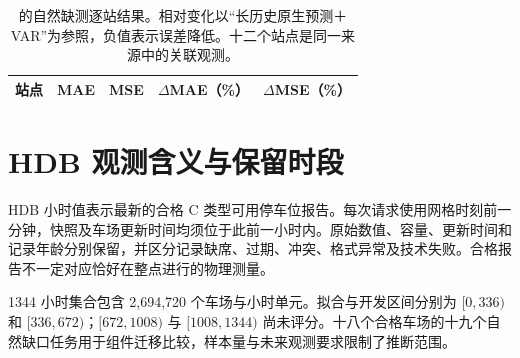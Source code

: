 \begin{table}[H]
\caption{\method{}的自然缺测逐站结果。相对变化以“长历史原生预测＋VAR”为参照，负值表示误差降低。十二个站点是同一来源中的关联观测。}
\label{tab:stations}
\centering\small
\begin{tabular}{lrrrr}
\toprule
站点 & MAE & MSE & $\Delta$MAE（\%） & $\Delta$MSE（\%）\\
\midrule

\end{tabular}
\end{table}

\section{HDB 观测含义与保留时段}
\label{app:hdb}

HDB 小时值表示最新的合格 C 类型可用停车位报告。每次请求使用网格时刻前一分钟，快照及车场更新时间均须位于此前一小时内。原始数值、容量、更新时间和记录年龄分别保留，并区分记录缺席、过期、冲突、格式异常及技术失败。合格报告不一定对应恰好在整点进行的物理测量。

1344 小时集合包含 2,694,720 个车场与小时单元。拟合与开发区间分别为 $[0,336)$ 和 $[336,672)$；$[672,1008)$ 与 $[1008,1344)$ 尚未评分。十八个合格车场的十九个自然缺口任务用于组件迁移比较，样本量与未来观测要求限制了推断范围。
